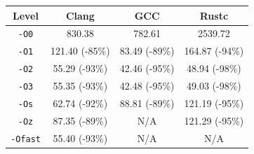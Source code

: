 \begin{tabular*}{\columnwidth}{@{\extracolsep\fill}cccc@{\extracolsep\fill}}
\toprule
\textbf{Level} & \textbf{Clang} & \textbf{GCC} & \textbf{Rustc} \\
\midrule
\texttt{-O0} & 830.38 & 782.61 & 2539.72 \\
\texttt{-O1} & 121.40 (-85\%) & 83.49 (-89\%) & 164.87 (-94\%) \\
\texttt{-O2} & 55.29 (-93\%) & 42.46 (-95\%) & 48.94 (-98\%) \\
\texttt{-O3} & 55.35 (-93\%) & 42.48 (-95\%) & 49.03 (-98\%) \\
\texttt{-Os} & 62.74 (-92\%) & 88.81 (-89\%) & 121.19 (-95\%) \\
\texttt{-Oz} & 87.35 (-89\%) & N/A & 121.29 (-95\%) \\
\texttt{-Ofast} & 55.40 (-93\%) & N/A & N/A \\
\bottomrule
\end{tabular*}
